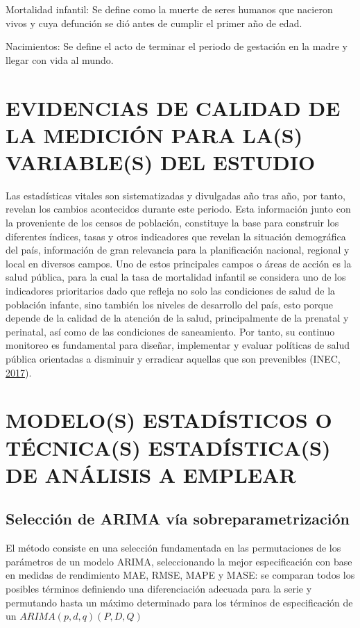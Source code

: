 \documentclass[]{article}
\begin{document}
Mortalidad infantil: Se define como la muerte de seres humanos que
nacieron vivos y cuya defunción se dió antes de cumplir el primer año de
edad.

Nacimientos: Se define el acto de terminar el periodo de gestación en la
madre y llegar con vida al mundo.

\section{EVIDENCIAS DE CALIDAD DE LA MEDICIÓN PARA LA(S) VARIABLE(S) DEL ESTUDIO}

Las estadísticas vitales son sistematizadas y divulgadas año tras año,
por tanto, revelan los cambios acontecidos durante este periodo. Esta
información junto con la proveniente de los censos de población,
constituye la base para construir los diferentes índices, tasas y otros
indicadores que revelan la situación demográfica del país, información
de gran relevancia para la planificación nacional, regional y local en
diversos campos. Uno de estos principales campos o áreas de acción es la
salud pública, para la cual la tasa de mortalidad infantil se considera
uno de los indicadores prioritarios dado que refleja no solo las
condiciones de salud de la población infante, sino también los niveles
de desarrollo del país, esto porque depende de la calidad de la atención
de la salud, principalmente de la prenatal y perinatal, así como de las
condiciones de saneamiento. Por tanto, su continuo monitoreo es
fundamental para diseñar, implementar y evaluar políticas de salud
pública orientadas a disminuir y erradicar aquellas que son prevenibles
(INEC, \protect\hyperlink{ref-calidad_vitales}{2017}).

\section{MODELO(S) ESTADÍSTICOS O TÉCNICA(S) ESTADÍSTICA(S) DE ANÁLISIS A EMPLEAR}

\subsection{Selección de ARIMA vía sobreparametrización}

El método consiste en una selección fundamentada en las permutaciones de
los parámetros de un modelo ARIMA, seleccionando la mejor especificación
con base en medidas de rendimiento MAE, RMSE, MAPE y MASE: se comparan
todos los posibles términos definiendo una diferenciación adecuada para
la serie y permutando hasta un máximo determinado para los términos de
especificación de un \(ARIMA(p,d,q)(P,D,Q)\)
\end{document}

